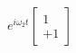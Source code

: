 \documentclass[preview]{standalone}
\begin{document}
\begin{center}
$e^{i\omega_2 t}\begin{bmatrix} 1 \\ +1\end{bmatrix}$
\end{center}
\end{document}
